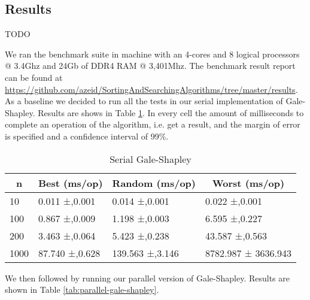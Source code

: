 \subsection{Results}

TODO

We ran the benchmark suite in machine with an 4-cores and 8 logical processors @ 3.4Ghz and 24Gb of DDR4 RAM @ 3,401Mhz. The benchmark result report can be found at \url{https://github.com/azeid/SortingAndSearchingAlgorithms/tree/master/results}.\\

As a baseline we decided to run all the tests in our serial implementation of Gale-Shapley. Results are shows in Table \ref{tab:serial-gale-shapley}. In every cell the amount of milliseconds to complete an operation of the algorithm, i.e. get a result, and the margin of error is specified and a confidence interval of 99\%. 

\begin{table}[!ht]
    \centering
\begin{tabular}{|l|l|l|l|}
\hline
\multicolumn{1}{|c|}{\textbf{n}} & \multicolumn{1}{c|}{\textbf{Best (ms/op)}} & \multicolumn{1}{c|}{\textbf{Random (ms/op)}} & \multicolumn{1}{c|}{\textbf{Worst (ms/op)}} \\ \hline
10                               & 0.011 ±,0.001                              & 0.014 ±,0.001                                & 0.022 ±,0.001                               \\ \hline
100                              & 0.867 ±,0.009                              & 1.198 ±,0.003                                & 6.595 ±,0.227                               \\ \hline
200                              & 3.463 ±,0.064                              & 5.423 ±,0.238                                & 43.587 ±,0.563                              \\ \hline
1000                             & 87.740 ±,0.628                             & 139.563 ±,3.146                              & 8782.987 ± 3636.943                         \\ \hline
\end{tabular}
    \caption{Serial Gale-Shapley}
    \label{tab:serial-gale-shapley}
\end{table}

We then followed by running our parallel version of Gale-Shapley. Results are shown in Table \ref{tab:parallel-gale-shapley}.


